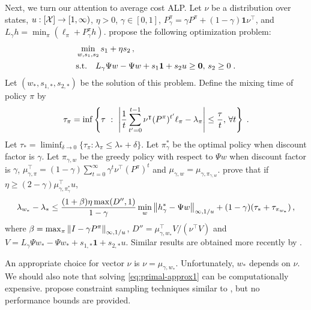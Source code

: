 \documentclass[11pt]{article}
\begin{document}


Next, we turn our attention to average cost ALP. Let $\nu$ be a distribution over states, $u:[{\cal X}]\rightarrow [1,\infty)$, $\eta>0$, $\gamma\in [0,1]$, $P_\gamma^\pi = \gamma P^\pi + (1-\gamma) \mathbf{1} \nu^\top$, and $L_\gamma h = \min_{\pi} (\ell_\pi + P_\gamma^\pi h)$.
\citet{DeFarias-VanRoy-2006} propose the following optimization problem:
\begin{align}
\label{eq:primal-approx1}
&\min_{w, s_1, s_2} s_1 + \eta s_2\,, \\
\notag
&\mbox{s.t.}\quad L_\gamma \Psi w - \Psi w + s_1 \mathbf{1} + s_2 u \ge \mathbf 0,\, s_2 \ge 0 \; .
\end{align}
Let $(w_*, s_{1,*}, s_{2,*})$ be the solution of this problem.
Define the mixing time of policy $\pi$ by
\[
\tau_\pi = \inf\left\{ \tau \ : \ \abs{\frac{1}{t} \sum_{t'=0}^{t-1} \nu^\top (P^\pi)^{t'} \ell_\pi - \lambda_\pi   } \le \frac{\tau}{t},\, \forall t \right\} \; .
\]
Let $\tau_* = \liminf_{\delta\rightarrow 0} \{ \tau_\pi : \lambda_\pi \le \lambda_* + \delta \}$. Let $\pi_{\gamma}^*$ be the optimal policy when discount factor is $\gamma$. Let $\pi_{\gamma, w}$ be the greedy policy with respect to $\Psi w$ when discount factor is $\gamma$, $\mu_{\gamma, \pi}^\top = 	(1-\gamma) \sum_{t=0}^\infty \gamma^t \nu^\top (P^\pi)^t$ and $\mu_{\gamma, w} = \mu_{\gamma, \pi_{\gamma, w}}$.
 \citet{DeFarias-VanRoy-2006} prove that if $\eta \ge (2-\gamma) \mu_{\gamma, \pi_{\gamma}^*}^\top u$,
\[
\lambda_{w_*} - \lambda_* \le \frac{(1+\beta) \eta \max(D'', 1)}{1-\gamma} \min_{w} \left\Vert h_\gamma^* - \Psi w\right\Vert_{\infty, 1/u} + (1-\gamma) (\tau_* + \tau_{\pi_{w_*}}) \,,
\]
where $\beta = \max_\pi \left\Vert I - \gamma P^\pi\right\Vert_{\infty, 1/u}$, $D'' = \mu_{\gamma, w_*}^\top V /  (\nu^\top V)$ and $V=L_\gamma \Psi w_* - \Psi w_* + s_{1,*} \mathbf{1} +  s_{2,*} u$. Similar results are obtained more recently by \citet{Veatch-2013}.

An appropriate choice for vector $\nu$ is $\nu=\mu_{\gamma, w_*}$. Unfortunately, $w_*$ depends on $\nu$. We should also note that solving \eqref{eq:primal-approx1} can be computationally expensive. \citet{DeFarias-VanRoy-2006} propose constraint sampling techniques similar to \citep{DeFarias-VanRoy-2004}, but no performance bounds are provided.
\end{document}
